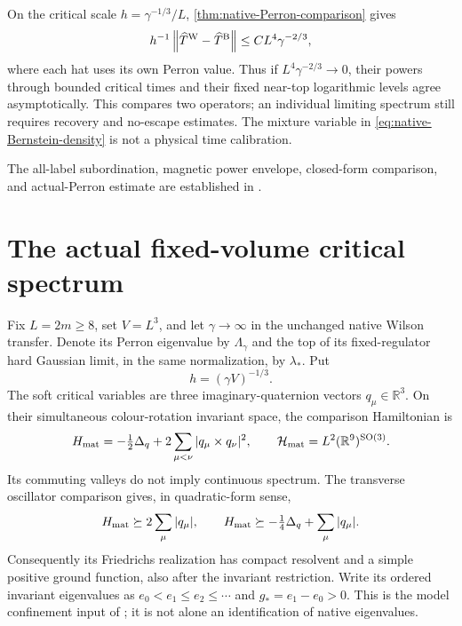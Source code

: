 \documentclass[11pt,oneside,openany]{book}
\theoremstyle{definition}
\theoremstyle{remark}
\newcommand{\R}{\mathbb R}
\newcommand{\src}[2]{\cite[#2]{#1}}
\newcommand{\sourcebasis}[1]{\par\smallskip\noindent #1\par}
\begin{document}
On the critical scale $h=\gamma^{-1/3}/L$,
\cref{thm:native-Perron-comparison} gives
\begin{equation}
 h^{-1}\left\|\widehat T^{\rm W}-\widehat T^{\rm B}\right\|
       \le C L^4\gamma^{-2/3},
 \label{eq:native-critical-comparison}
\end{equation}
where each hat uses its own Perron value. Thus if
$L^4\gamma^{-2/3}\to0$, their powers through bounded critical times
and their fixed near-top logarithmic levels agree asymptotically.
This compares two operators; an individual limiting spectrum still
requires recovery and no-escape estimates. The mixture variable in
\cref{eq:native-Bernstein-density} is not a physical time calibration.
\sourcebasis{The all-label subordination, magnetic power envelope,
closed-form comparison, and actual-Perron estimate are established in
\src{F16B}{V53}.}


\section{The actual fixed-volume critical spectrum}
\label{sec:native-critical-spectrum}
Fix $L=2m\ge8$, set $V=L^3$, and let $\gamma\to\infty$ in the
unchanged native Wilson transfer. Denote its Perron eigenvalue by
$\Lambda_\gamma$ and the top of its fixed-regulator hard Gaussian
limit, in the same normalization, by $\lambda_*$. Put
\begin{equation}
 h=(\gamma V)^{-1/3}.
 \label{eq:native-critical-scale}
\end{equation}
The soft critical variables are three imaginary-quaternion vectors
$q_\mu\in\R^3$. On their simultaneous colour-rotation invariant space,
the comparison Hamiltonian is
\begin{equation}
 H_{\rm mat}=-\tfrac12\Delta_q
              +2\sum_{\mu<\nu}|q_\mu\times q_\nu|^2,
 \qquad
 \mathcal H_{\rm mat}=L^2(\R^9)^{\mathrm{SO}(3)}.
 \label{eq:native-quartic-model}
\end{equation}
Its commuting valleys do not imply continuous spectrum. The transverse
oscillator comparison gives, in quadratic-form sense,
\[
 H_{\rm mat}\succeq2\sum_\mu|q_\mu|,
 \qquad
 H_{\rm mat}\succeq-\tfrac14\Delta_q+\sum_\mu|q_\mu|.
\]
Consequently its Friedrichs realization has compact resolvent and a
simple positive ground function, also after the invariant restriction.
Write its ordered invariant eigenvalues as
$e_0<e_1\le e_2\le\cdots$ and $g_*=e_1-e_0>0$.
This is the model confinement input of \src{F16}{V44}; it is not alone
an identification of native eigenvalues.
\end{document}
